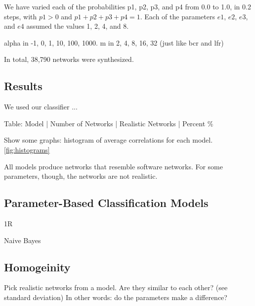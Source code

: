 We have varied each of the probabilities p1, p2, p3, and p4 from 0.0 to 1.0, in
0.2 steps, with $p1 > 0$ and $p1 + p2 + p3 + p4 = 1$. Each of the parameters
$e1$, $e2$, $e3$, and $e4$ assumed the values 1, 2, 4, and 8.


alpha in -1, 0, 1, 10, 100, 1000. 
m in 2, 4, 8, 16, 32 (just like bcr and lfr)

In total, 38,790 networks were synthesized.

\subsection{Results}

We used our classifier ...

Table: Model | Number of Networks | Realistic Networks | Percent \%

Show some graphs: histogram of average correlations for each model.
\ref{fig:histograms}


%
%
%
%

All models produce networks that resemble software networks.  For some
parameters, though, the networks are not realistic.

\subsection{Parameter-Based Classification Models}

1R

Naive Bayes

\subsection{Homogeinity}

Pick realistic networks from a model. Are they similar to each other? (see
standard deviation) In other words: do the parameters make a difference?

